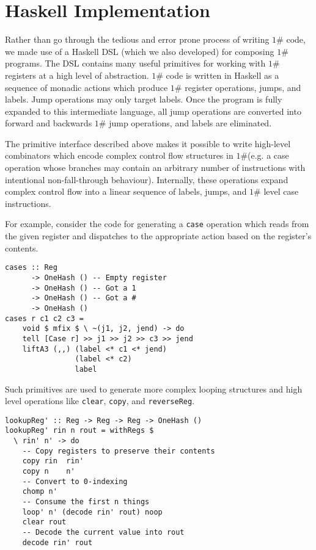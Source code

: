 \documentclass[10pt, preprint, nocopyrightspace]{sigplanconf}
\newcommand{\oh}{$1\#$\xspace}
\begin{document}
\section{Haskell Implementation}


Rather than go through the tedious and error prone process of writing \oh code,
we made use of a Haskell DSL (which we also developed) for composing \oh
programs.
The DSL contains many useful primitives for working with \oh registers at a high
level of abstraction.
\oh code is written in Haskell as a sequence of monadic actions which produce
\oh register operations, jumps, and labels.
Jump operations may only target labels.
Once the program is fully expanded to this intermediate language, all jump
operations are converted into forward and backwards \oh jump operations, and
labels are eliminated.

The primitive interface described above makes it possible to write high-level
combinators which encode complex control flow structures in \oh (e.g. a case
operation whose branches may contain an arbitrary number of instructions with
intentional non-fall-through behaviour).
Internally, these operations expand complex control flow into a linear sequence
of labels, jumps, and \oh level case instructions.

For example, consider the code for generating a \texttt{case} operation which
reads from the given register and dispatches to the appropriate action based
on the register's contents.
\begin{lstlisting}
cases :: Reg
      -> OneHash () -- Empty register
      -> OneHash () -- Got a 1
      -> OneHash () -- Got a #
      -> OneHash ()
cases r c1 c2 c3 =
    void $ mfix $ \ ~(j1, j2, jend) -> do
    tell [Case r] >> j1 >> j2 >> c3 >> jend
    liftA3 (,,) (label <* c1 <* jend)
                (label <* c2)
                label
\end{lstlisting}
Such primitives are used to generate more complex looping structures and high level
operations like \texttt{clear}, \texttt{copy}, and \texttt{reverseReg}.

\begin{lstlisting}
lookupReg' :: Reg -> Reg -> Reg -> OneHash ()
lookupReg' rin n rout = withRegs $
  \ rin' n' -> do
    -- Copy registers to preserve their contents
    copy rin  rin'
    copy n    n'
    -- Convert to 0-indexing
    chomp n'
    -- Consume the first n things
    loop' n' (decode rin' rout) noop
    clear rout
    -- Decode the current value into rout
    decode rin' rout
\end{lstlisting}
\end{document}
